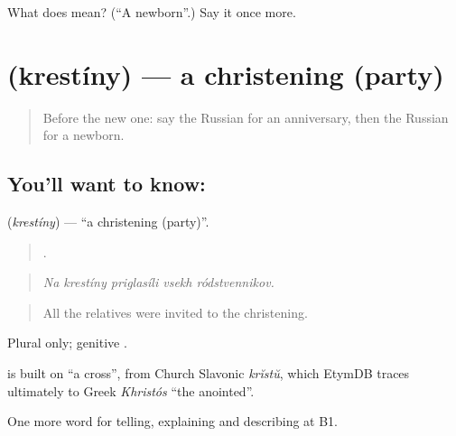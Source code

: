 \begin{tcolorbox}[breakable,colback=teal!4,colframe=teal!35!black,title={Before you move on}]
What does  mean? (\textquotedblleft{}A newborn\textquotedblright{}.) Say it once more.
\end{tcolorbox}
\section[\texorpdfstring{\ru{крестины} (krestíny)}{крестины (krestíny)}]{ (krestíny) — a christening (party)}

\label{lesson:RU-C310-krestiny}



\begin{quote}
Before the new one: say the Russian for an anniversary, then the Russian for a newborn.
\end{quote}

\subsection*{You'll want to know: }
\textbf{} (\emph{krestíny}) — \textquotedblleft{}a christening (party)\textquotedblright{}.

\begin{quote}
    .
\end{quote}

\begin{quote}
\emph{Na krestíny priglasíli vsekh ródstvennikov.}
\end{quote}

\begin{quote}
All the relatives were invited to the christening.
\end{quote}

Plural only; genitive \emph{}.

\begin{cousinweb}
\emph{} is built on \emph{} \textquotedblleft{}a cross\textquotedblright{}, from Church Slavonic \emph{krĭstŭ}, which EtymDB traces ultimately to Greek \emph{Khristós} \textquotedblleft{}the anointed\textquotedblright{}.
\end{cousinweb}

\begin{grammarlens}[title={What you've built}]
One more word for telling, explaining and describing at B1.
\end{grammarlens}

